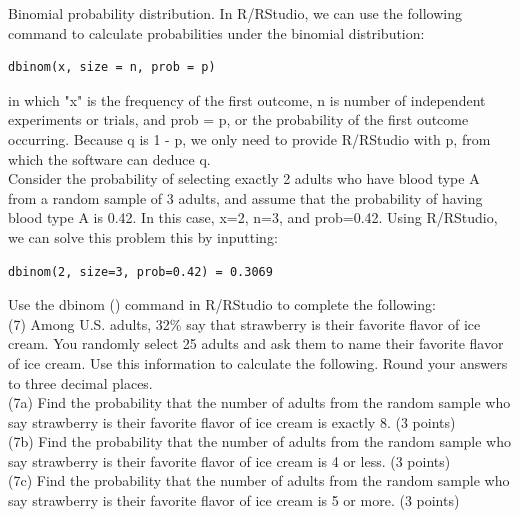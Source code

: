 \documentclass{article}
\begin{document}
Binomial probability distribution. In R/RStudio, we can use the following command to calculate probabilities under the binomial distribution:
\begin{center}
\begin{lstlisting}
dbinom(x, size = n, prob = p)
\end{lstlisting}
\end{center}

in which "x" is the frequency of the first outcome, n is number of independent experiments or trials, and prob = p, or the probability of the first outcome occurring. Because q is 1 - p, we only need to provide R/RStudio with p, from which the software can deduce q.\\

Consider the probability of selecting exactly 2 adults who have blood type A from a random sample of 3 adults, and assume that the probability of having blood type A is 0.42. In this case, x=2, n=3, and prob=0.42. Using R/RStudio, we can solve this problem this by inputting:
\begin{center}
\begin{lstlisting}
dbinom(2, size=3, prob=0.42) = 0.3069
\end{lstlisting}
\end{center}


Use the dbinom () command in R/RStudio to complete the following:\\

(7) Among U.S. adults, 32\% say that strawberry is their favorite flavor of ice cream. You randomly select 25 adults and ask them to name their favorite flavor of ice cream. Use this information to calculate the following. Round your answers to three decimal places.\\



(7a) Find the probability that the number of adults from the random sample who say strawberry is their favorite flavor of ice cream is exactly 8. (3 points)\\

(7b) Find the probability that the number of adults from the random sample who say strawberry is their favorite flavor of ice cream is 4 or less. (3 points)\\

(7c) Find the probability that the number of adults from the random sample who say strawberry is their favorite flavor of ice cream is 5 or more. (3 points)\\
\end{document}
